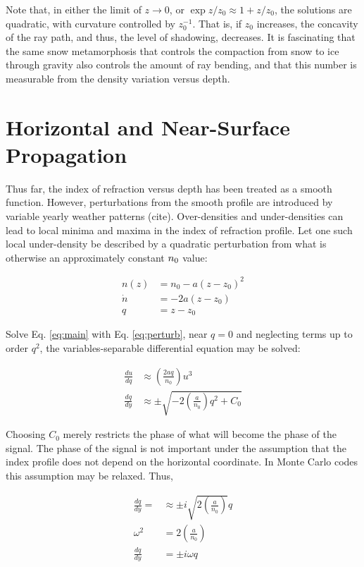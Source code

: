 \documentclass[12pt]{article}
\begin{document}
Note that, in either the limit of $z \rightarrow 0$, or $\exp{z/z_0} \approx 1+z/z_0$, the solutions are quadratic, with curvature controlled by $z_0^{-1}$.  That is, if $z_0$ increases, the concavity of the ray path, and thus, the level of shadowing, decreases.  It is fascinating that the same snow metamorphosis that controls the compaction from snow to ice through gravity also controls the amount of ray bending, and that this number is measurable from the density variation versus depth.

\section{Horizontal and Near-Surface Propagation}

Thus far, the index of refraction versus depth has been treated as a smooth function.  However, perturbations from the smooth profile are introduced by variable yearly weather patterns (cite).  Over-densities and under-densities can lead to local minima and maxima in the index of refraction profile.  Let one such local under-density be described by a quadratic perturbation from what is otherwise an approximately constant $n_{\rm 0}$ value:

\begin{align}
n(z) &= n_0 - a(z-z_0)^2 \label{eq:perturb} \\
\dot{n} &= -2a(z-z_0) \\
q &= z-z_0
\end{align}

Solve Eq. \ref{eq:main} with Eq. \ref{eq:perturb}, near $q=0$ and neglecting terms up to order $q^2$, the variables-separable differential equation may be solved:

\begin{align}
\frac{du}{dq} &\approx \left(\frac{2aq}{n_0}\right) u^3 \\
\frac{dq}{dy} &\approx \pm \sqrt{-2\left(\frac{a}{n_0}\right) q^2 + C_0}
\end{align}

Choosing $C_0$ merely restricts the phase of what will become the phase of the signal.  The phase of the signal is not important under the assumption that the index profile does not depend on the horizontal coordinate.  In Monte Carlo codes this assumption may be relaxed.  Thus,

\begin{align}
\frac{dq}{dy} = &\approx \pm i \sqrt{2\left(\frac{a}{n_0}\right)}q \\
\omega^2 &= 2 \left(\frac{a}{n_0}\right) \\
\frac{dq}{dy} &= \pm i\omega q \label{eq:SHO}
\end{align}
\end{document}

